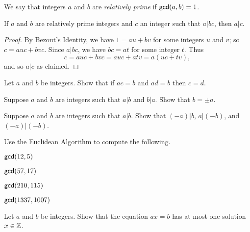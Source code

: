 \begin{dfn}
We say that integers \(a\) and \(b\) are \emph{relatively prime} if \(\mathsf{gcd}(a, b) = 1\).
\end{dfn}

\begin{thm}
If \(a\) and \(b\) are relatively prime integers and \(c\) an integer such that \(a | bc\), then \(a|c\).
\end{thm}

\begin{proof}
By Bezout's Identity, we have \(1 = au + bv\) for some integers \(u\) and \(v\); so \(c = auc + bvc\).
Since \(a|bc\), we have \(bc = at\) for some integer \(t\).
Thus \[ c = auc + bvc = auc + atv = a(uc + tv), \] and so \(a|c\) as claimed.
\end{proof}



\Exercises%

\begin{exercise}
Let \(a\) and \(b\) be integers.
Show that if \(ac = b\) and \(ad = b\) then \(c = d\).
\end{exercise}

\begin{exercise}
Suppose \(a\) and \(b\) are integers such that \(a|b\) and \(b|a\).
Show that \(b = \pm a\).
\end{exercise}

\begin{exercise}
Suppose \(a\) and \(b\) are integers such that \(a|b\).
Show that \((-a)|b\), \(a|(-b)\), and \((-a)|(-b)\).
\end{exercise}

\begin{exercise}
Use the Euclidean Algorithm to compute the following.
\begin{proplist*}
\item \(\mathsf{gcd}(12, 5)\)
\item \(\mathsf{gcd}(57, 17)\)
\item \(\mathsf{gcd}(210, 115)\)
\item \(\mathsf{gcd}(1337, 1007)\)
\end{proplist*}
\end{exercise}

\begin{exercise}
Let \(a\) and \(b\) be integers.
Show that the equation \(ax = b\) has at most one solution \(x \in \mathbb{Z}\).
\end{exercise}
